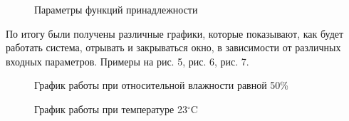 \documentclass[a4paper]{article}
\begin{document}
\begin{figure}[h!]
\begin{minipage}[h]{0.5\linewidth}
    \end{minipage}
    \begin{minipage}[h]{0.5\linewidth}
    \end{minipage}
    \caption{Параметры функций принадлежности} 
\end{figure}

\newpage
По итогу были получены различные графики, которые показывают, как будет
работать система, отрывать и закрываться окно, в зависимости от различных
входных параметров. Примеры на рис. 5, рис. 6, рис. 7. 

\newpage
\begin{figure}[h]
    \caption{График работы при относительной влажности равной 50\%} 
\end{figure}

\begin{figure}[h]
    \caption{График работы при температуре 23$^{\circ}$C} 
\end{figure}
\end{document}
